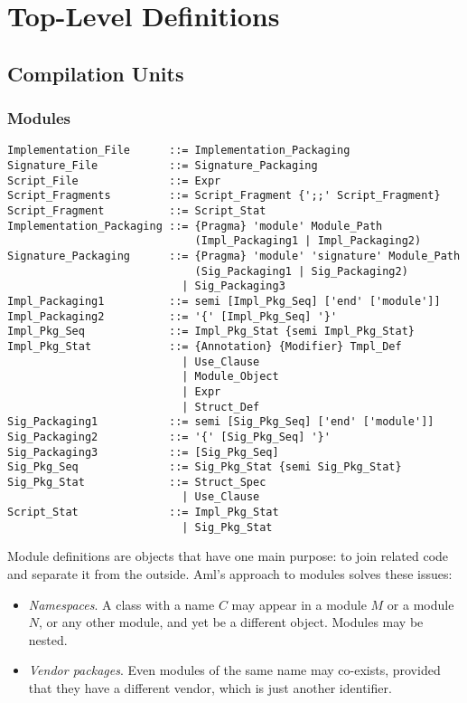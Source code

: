 
\chapter{Top-Level Definitions}

\minitoc

\newpage

\section{Compilation Units}
\label{sec:compilation-units}

\subsection{Modules}
\label{sec:modules}

\grammar\begin{lstlisting}
Implementation_File      ::= Implementation_Packaging
Signature_File           ::= Signature_Packaging
Script_File              ::= Expr
Script_Fragments         ::= Script_Fragment {';;' Script_Fragment}
Script_Fragment          ::= Script_Stat
Implementation_Packaging ::= {Pragma} 'module' Module_Path 
                             (Impl_Packaging1 | Impl_Packaging2)
Signature_Packaging      ::= {Pragma} 'module' 'signature' Module_Path
                             (Sig_Packaging1 | Sig_Packaging2)
                           | Sig_Packaging3
Impl_Packaging1          ::= semi [Impl_Pkg_Seq] ['end' ['module']]
Impl_Packaging2          ::= '{' [Impl_Pkg_Seq] '}'
Impl_Pkg_Seq             ::= Impl_Pkg_Stat {semi Impl_Pkg_Stat}
Impl_Pkg_Stat            ::= {Annotation} {Modifier} Tmpl_Def
                           | Use_Clause
                           | Module_Object
                           | Expr
                           | Struct_Def
Sig_Packaging1           ::= semi [Sig_Pkg_Seq] ['end' ['module']]
Sig_Packaging2           ::= '{' [Sig_Pkg_Seq] '}'
Sig_Packaging3           ::= [Sig_Pkg_Seq]
Sig_Pkg_Seq              ::= Sig_Pkg_Stat {semi Sig_Pkg_Stat}
Sig_Pkg_Stat             ::= Struct_Spec
                           | Use_Clause
Script_Stat              ::= Impl_Pkg_Stat
                           | Sig_Pkg_Stat
\end{lstlisting}

Module definitions are objects that have one main purpose: to join related code and separate it from the outside. Aml's approach to modules solves these issues: 
\begin{itemize}
  \item {\em Namespaces}. A class with a name $C$ may appear in a module $M$ or a module $N$, or any other module, and yet be a different object. Modules may be nested.
  \item {\em Vendor packages}. Even modules of the same name may co-exists, provided that they have a different vendor, which is just another identifier. 
\end{itemize}

